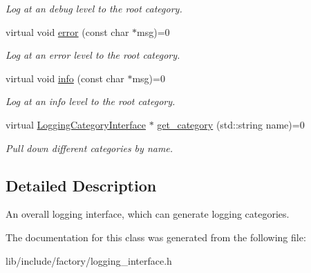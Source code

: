 \begin{DoxyCompactItemize}
\begin{DoxyCompactList}\small\item\em Log at an debug level to the root category. \end{DoxyCompactList}\item 
\hypertarget{classLoggingInterface_a1cea9e37dae316f39e171654e5e0dc0f}{virtual void \hyperlink{classLoggingInterface_a1cea9e37dae316f39e171654e5e0dc0f}{error} (const char $\ast$msg)=0}\label{classLoggingInterface_a1cea9e37dae316f39e171654e5e0dc0f}

\begin{DoxyCompactList}\small\item\em Log at an error level to the root category. \end{DoxyCompactList}\item 
\hypertarget{classLoggingInterface_a7aed25910dd1cdebe3906b4b33d75a80}{virtual void \hyperlink{classLoggingInterface_a7aed25910dd1cdebe3906b4b33d75a80}{info} (const char $\ast$msg)=0}\label{classLoggingInterface_a7aed25910dd1cdebe3906b4b33d75a80}

\begin{DoxyCompactList}\small\item\em Log at an info level to the root category. \end{DoxyCompactList}\item 
\hypertarget{classLoggingInterface_add380ece858220c46aeb38ce1531a6c7}{virtual \hyperlink{classLoggingCategoryInterface}{Logging\-Category\-Interface} $\ast$ \hyperlink{classLoggingInterface_add380ece858220c46aeb38ce1531a6c7}{get\-\_\-category} (std\-::string name)=0}\label{classLoggingInterface_add380ece858220c46aeb38ce1531a6c7}

\begin{DoxyCompactList}\small\item\em Pull down different categories by name. \end{DoxyCompactList}\end{DoxyCompactItemize}


\subsection{Detailed Description}
An overall logging interface, which can generate logging categories. 

The documentation for this class was generated from the following file\-:\begin{DoxyCompactItemize}
\item 
lib/include/factory/logging\-\_\-interface.\-h\end{DoxyCompactItemize}
